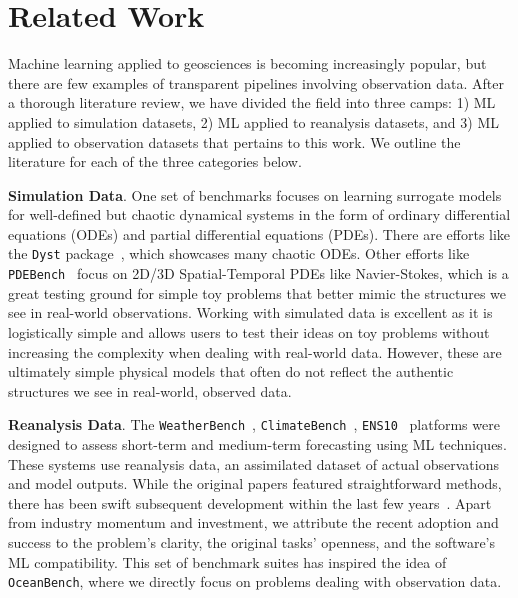 \section{Related Work}

Machine learning applied to geosciences is becoming increasingly popular, but there are few examples of transparent pipelines involving observation data. 
After a thorough literature review, we have divided the field into three camps: 1) ML applied to simulation datasets, 2) ML applied to reanalysis datasets, and 3) ML applied to observation datasets that pertains to this work. 
We outline the literature for each of the three categories below.

\textbf{Simulation Data}. 
One set of benchmarks focuses on learning surrogate models for well-defined but chaotic dynamical systems in the form of ordinary differential equations (ODEs) and partial differential equations (PDEs). 
There are efforts like the \texttt{Dyst} package~\cite{CHAOSBENCH}, which showcases many chaotic ODEs. 
Other efforts like \texttt{PDEBench}~\cite{PDEBench} focus on 2D/3D Spatial-Temporal PDEs like Navier-Stokes, which is a great testing ground for simple toy problems that better mimic the structures we see in real-world observations. 
Working with simulated data is excellent as it is logistically simple and allows users to test their ideas on toy problems without increasing the complexity when dealing with real-world data.
However, these are ultimately simple physical models that often do not reflect the authentic structures we see in real-world, observed data.

\textbf{Reanalysis Data}. 
The \texttt{WeatherBench}~\cite{weatherbench}, \texttt{ClimateBench}~\cite{ClimateBench}, \texttt{ENS10}~\cite{ENS10Bench} platforms were designed to assess short-term and medium-term forecasting using ML techniques.
These systems use reanalysis data, an assimilated dataset of actual observations and model outputs.
While the original papers featured straightforward methods, there has been swift subsequent development within the last few years~\cite{GraphCast,FourCastNet}. 
Apart from industry momentum and investment, we attribute the recent adoption and success to the problem's clarity, the original tasks' openness, and the software's ML compatibility. 
This set of benchmark suites has inspired the idea of \texttt{OceanBench}, where we directly focus on problems dealing with observation data.

